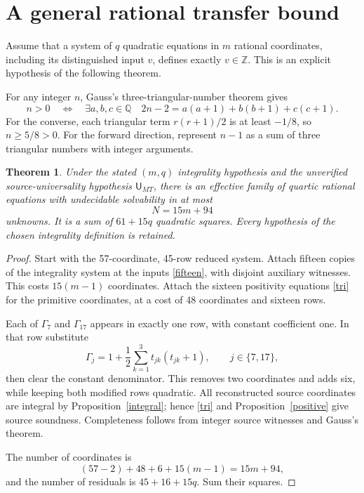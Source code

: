 \documentclass[11pt]{article}
\newtheorem{theorem}{Theorem}
\newcommand{\Z}{\mathbb Z}
\newcommand{\Q}{\mathbb Q}
\begin{document}
\section{A general rational transfer bound}
Assume that a system of \(q\) quadratic equations in \(m\) rational
coordinates, including its distinguished input \(v\), defines exactly
\(v\in\Z\). This is an explicit hypothesis of the following theorem.

For any integer \(n\), Gauss's three-triangular-number theorem gives
\begin{equation}\label{tri}
n>0\quad\Longleftrightarrow\quad
\exists a,b,c\in\Q\quad
 2n-2=a(a+1)+b(b+1)+c(c+1).
\end{equation}
For the converse, each triangular term \(r(r+1)/2\) is at least
\(-1/8\), so \(n\ge5/8>0\). For the forward direction, represent
\(n-1\) as a sum of three triangular numbers with integer arguments.

\begin{theorem}\label{transfer}
Under the stated \((m,q)\) integrality hypothesis and the unverified
source-universality hypothesis \(\mathsf U_{MT}\), there is an effective
family of quartic rational equations with undecidable solvability in at
most
\[
 N=15m+94
\]
unknowns. It is a sum of \(61+15q\) quadratic squares. Every hypothesis
of the chosen integrality definition is retained.
\end{theorem}
\begin{proof}
Start with the 57-coordinate, 45-row reduced system. Attach fifteen copies
of the integrality system at the inputs \eqref{fifteen}, with disjoint
auxiliary witnesses. This costs \(15(m-1)\) coordinates. Attach the
sixteen positivity equations \eqref{tri} for the primitive coordinates,
at a cost of 48 coordinates and sixteen rows.

Each of \(\Gamma_7\) and \(\Gamma_{17}\) appears in exactly one
row, with constant coefficient one. In that row substitute
\[
\Gamma_j=1+\frac12\sum_{k=1}^3 t_{jk}(t_{jk}+1),
\qquad j\in\{7,17\},
\]
then clear the constant denominator. This removes two coordinates and
adds six, while keeping both modified rows quadratic. All reconstructed
source coordinates are integral by Proposition~\ref{integral}; hence
\eqref{tri} and Proposition~\ref{positive} give source soundness.
Completeness follows from integer source witnesses and Gauss's theorem.

The number of coordinates is
\[
(57-2)+48+6+15(m-1)=15m+94,
\]
and the number of residuals is \(45+16+15q\). Sum their squares.
\end{proof}
\end{document}
